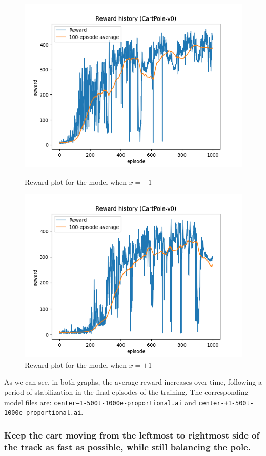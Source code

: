 \documentclass[12pt]{article}
\begin{document}
\begin{figure}[ht]
    \centering
   \begin{minipage}{0.48\textwidth}
     \centering
     \includegraphics[width=0.7\linewidth]{exercise-1/report/img/rewards/center--1-500t-1000e-proportional.png}
     \caption{Reward plot for the model when $x=-1$}
     \label{fig:reard-1}
   \end{minipage}\hfill
   \begin{minipage}{0.48\textwidth}
     \centering
     \includegraphics[width=0.7\linewidth]{exercise-1/report/img/rewards/center-1-500t-1000e.png}
     \caption{Reward plot for the model when $x=+1$}
     \label{fig:task-2-right}
   \end{minipage}
\end{figure}

As we can see, in both graphs, the average reward increases over time, following a period of stabilization in the final episodes of the training. The corresponding model files are: \texttt{center--1-500t-1000e-proportional.ai} and \texttt{center-+1-500t-1000e-proportional.ai}.

\subsubsection{Keep the cart moving from the leftmost to rightmost side of the track as fast as possible, while still
balancing the pole.}
\label{sec:balance}
\end{document}
